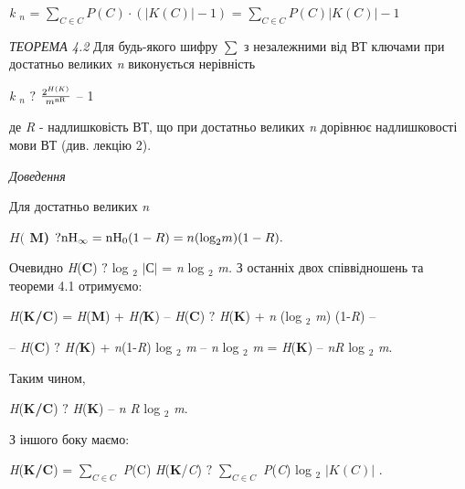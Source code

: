 \documentclass[a4paper]{article}
\newcounter{}
\newcommand\normalsubformula[1]{\text{\mathversion{normal}$#1$}}
\begin{document}
\bigskip

{\centering
\textit{k} ${{}_{{n}}}$ =   ${\underset{{C\in C}}{\sum }{P(C)\cdot (|K(C)|-1)}}$
=   ${\underset{{C\in C}}{\sum }{P(C)|K(C)|-1}}$
\par}


\bigskip

\textit{ТЕОРЕМА 4.2}\textit{  }Для будь-якого шифру   ${\sum {}}$ з незалежними
від ВТ ключами  при достатньо великих \textit{n} виконується  нерівність 

{\centering
\textit{k} ${{}_{{n}}}$   ${?}$  
${\frac{2^{{H(K)}}}{m^{{\normalsubformula{\text{nR}}}}}}$ –  1 
\par}


\bigskip

 де  \textit{R}  {}-  надлишковість  ВТ, що при достатньо великих \textit{n}
дорівнює надлишковості мови ВТ (див. лекцію 2).

{\itshape
Доведення }

 Для  достатньо великих  \textit{n} 

{\centering\bfseries
 ${H(}$ M) ${?\normalsubformula{\text{nH}}_{{\infty
}}=\normalsubformula{\text{nH}}_{{0}}(1-R)=n(\text{log}_{{2}}m)(1-R)\text{.}}$
\par}

Очевидно \textit{ }\textit{H}(\textbf{C})  ${?}$  log ${{}_{{2}}}$
${|\text{С}|}$ =  \textit{n} log ${{}_{{2}}}$ \textit{m}\textit{.}  З останніх
двох співвідношень та теореми 4.1  отримуємо:

{\centering
\textit{H}(\textbf{K}\textbf{/}\textbf{C}) = \textit{H}(\textbf{M}) +
\textit{H}\textit{(}\textbf{K}) – \textit{H}(\textbf{C})  ${?}$ 
\textit{H}(\textbf{K}) + \textit{n} (log ${{}_{{2}}}$ \textit{m})
(1-\textit{R}) –
\par}

{\centering
– \textit{H}(\textbf{C})  ${?}$ \textit{H}\textit{(}\textbf{K}) +
\textit{n}(1-\textit{R}) log ${{}_{{2}}}$ \textit{m} – \textit{n} log
${{}_{{2}}}$ \textit{m} = \textit{H}(\textbf{K}) – \textit{nR} log ${{}_{{2}}}$
\textit{m}.
\par}

Таким чином, 

{\centering
\textit{H}(\textbf{K}\textbf{/}\textbf{C}) ${?}$\textit{ }\textit{H}(\textbf{K})
– \textit{n}\textit{ }\textit{R} log ${{}_{{2}}}$ \textit{m}.
\par}

З іншого боку маємо:

{\centering
\textit{H}(\textbf{K}\textbf{/}\textbf{C}) =   ${\underset{{C\in C}}{\sum }{}}$
\textit{P}(C) \textit{H}(\textbf{K}/\textit{C})  ${?}$  ${\underset{{C\in
C}}{\sum }{}}$ \textit{P}(\textit{C}) log ${{}_{{2}}}$ ${|K(C)|}$ .
\par}
\end{document}
